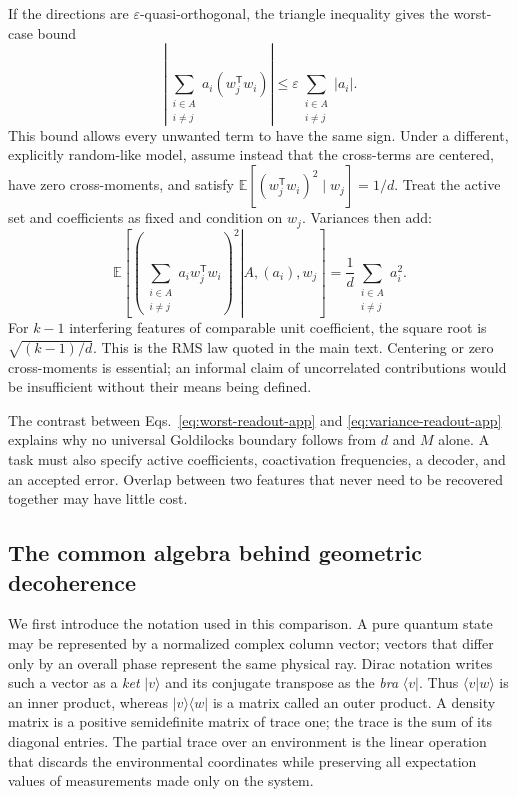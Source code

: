\documentclass[
  aps,
  reprint,
  superscriptaddress,
  floatfix,
  nofootinbib,
  longbibliography
]{revtex4-2}
\newcommand{\E}{\mathbb{E}}
\newcommand{\T}{^{\mathsf T}}
\begin{document}
If the directions are $\varepsilon$-quasi-orthogonal, the triangle inequality
gives the worst-case bound
\begin{equation}
 \left|
 \sum_{\substack{i\in A\\i\ne j}}a_i(w_j\T w_i)
 \right|
 \leq\varepsilon\sum_{\substack{i\in A\\i\ne j}}|a_i|.
 \label{eq:worst-readout-app}
\end{equation}
This bound allows every unwanted term to have the same sign.  Under a
different, explicitly random-like model, assume instead that the cross-terms
are centered, have zero cross-moments, and satisfy
$\E[(w_j\T w_i)^2\mid w_j]=1/d$.  Treat the active set and coefficients as fixed
and condition on $w_j$.  Variances then add:
\begin{equation}
 \E\!\left[
 \left.
 \left(\sum_{\substack{i\in A\\i\ne j}}a_iw_j\T w_i\right)^2
 \right|A,(a_i),w_j
 \right]
 =\frac1d\sum_{\substack{i\in A\\i\ne j}}a_i^2.
 \label{eq:variance-readout-app}
\end{equation}
For $k-1$ interfering features of comparable unit coefficient, the square root
is $\sqrt{(k-1)/d}$.  This is the RMS law quoted in the main text.  Centering
or zero cross-moments is essential; an informal claim of uncorrelated
contributions would be insufficient without their means being defined.

The contrast between Eqs.~\eqref{eq:worst-readout-app} and
\eqref{eq:variance-readout-app} explains why no universal Goldilocks boundary
follows from $d$ and $M$ alone.  A task must also specify active coefficients,
coactivation frequencies, a decoder, and an accepted error.  Overlap between
two features that never need to be recovered together may have little cost.

\subsection{The common algebra behind geometric decoherence}
\label{app:dirac}

We first introduce the notation used in this comparison.  A pure quantum
state may be represented by a normalized complex column vector; vectors that
differ only by an overall phase represent the same physical ray.  Dirac
notation writes such a vector as a
\emph{ket} $|v\rangle$ and its conjugate transpose as the \emph{bra}
$\langle v|$.  Thus $\langle v|w\rangle$ is an inner product, whereas
$|v\rangle\langle w|$ is a matrix called an outer product.  A density matrix
is a positive semidefinite matrix of trace one; the trace is the sum of its
diagonal entries.  The partial trace over an environment is the linear
operation that discards the environmental coordinates while preserving all
expectation values of measurements made only on the system.
\end{document}
